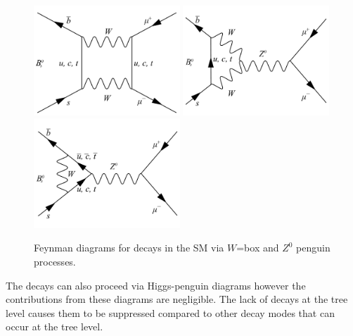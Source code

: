 \begin{figure}[htbp]
    \centering
        \includegraphics[width=0.49\textwidth]{./Figs/Theory/W_diagram.pdf}
        \includegraphics[width=0.49\textwidth]{./Figs/Theory/Z0_penguin_v1.pdf}
        \includegraphics[width=0.49\textwidth]{./Figs/Theory/Z0_penguin_v2.pdf}
    \caption{Feynman diagrams for \bmumu decays in the SM via $W$=box and $Z^0$ penguin processes.}
    \label{fig:SM_diag}
\end{figure}

The decays can also proceed via Higgs-penguin diagrams however the contributions from these diagrams are negligible. %
The lack of \bmumu decays at the tree level causes them to be suppressed compared to other \bsd decay modes that can occur at the tree level.



